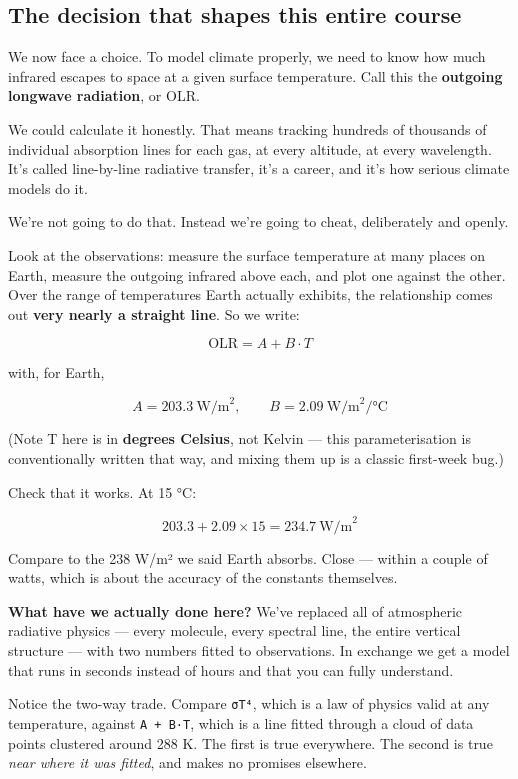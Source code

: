 \subsection{The decision that shapes this entire
course}\label{the-decision-that-shapes-this-entire-course}

We now face a choice. To model climate properly, we need to know how
much infrared escapes to space at a given surface temperature. Call this
the \textbf{outgoing longwave radiation}, or OLR.

We could calculate it honestly. That means tracking hundreds of
thousands of individual absorption lines for each gas, at every
altitude, at every wavelength. It's called line-by-line radiative
transfer, it's a career, and it's how serious climate models do it.

We're not going to do that. Instead we're going to cheat, deliberately
and openly.

Look at the observations: measure the surface temperature at many places
on Earth, measure the outgoing infrared above each, and plot one against
the other. Over the range of temperatures Earth actually exhibits, the
relationship comes out \textbf{very nearly a straight line}. So we
write:

\[ \text{OLR} = A + B \cdot T \]

with, for Earth,

\[ A = 203.3 \ \text{W/m}^2, \qquad B = 2.09 \ \text{W/m}^2/°\text{C} \]

(Note T here is in \textbf{degrees Celsius}, not Kelvin --- this
parameterisation is conventionally written that way, and mixing them up
is a classic first-week bug.)

Check that it works. At 15 °C:

\[ 203.3 + 2.09 \times 15 = 234.7 \ \text{W/m}^2 \]

Compare to the 238 W/m² we said Earth absorbs. Close --- within a couple
of watts, which is about the accuracy of the constants themselves.

\textbf{What have we actually done here?} We've replaced all of
atmospheric radiative physics --- every molecule, every spectral line,
the entire vertical structure --- with two numbers fitted to
observations. In exchange we get a model that runs in seconds instead of
hours and that you can fully understand.

Notice the two-way trade. Compare \texttt{σT⁴}, which is a law of
physics valid at any temperature, against \texttt{A\ +\ B·T}, which is a
line fitted through a cloud of data points clustered around 288 K. The
first is true everywhere. The second is true \emph{near where it was
fitted}, and makes no promises elsewhere.

